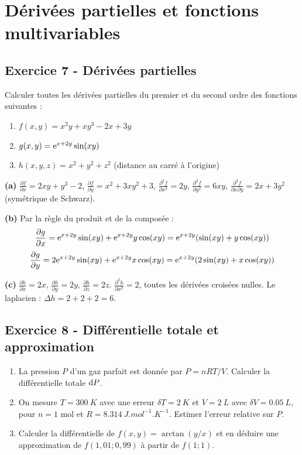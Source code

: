 \documentclass[12pt,a4paper]{article}
\begin{document}
\section{Dérivées partielles et fonctions multivariables}

\subsection*{Exercice 7 - Dérivées partielles \niveau{\facile}}

\begin{boiteexercice}
Calculer toutes les dérivées partielles du premier et du second ordre des fonctions suivantes :
\begin{enumerate}[label=(\alph*)]
  \item $f(x,y) = x^2 y + xy^3 - 2x + 3y$
  \item $g(x,y) = \mathrm{e}^{x+2y}\sin(xy)$
  \item $h(x,y,z) = x^2+y^2+z^2$ (distance au carré à l'origine)
\end{enumerate}
\end{boiteexercice}

\begin{boitecorrige}
\textbf{(a)} $\frac{\partial f}{\partial x} = 2xy+y^3-2$, $\frac{\partial f}{\partial y} = x^2+3xy^2+3$, $\frac{\partial^2 f}{\partial x^2}=2y$, $\frac{\partial^2 f}{\partial y^2}=6xy$, $\frac{\partial^2 f}{\partial x\partial y}=2x+3y^2$ (symétrique de Schwarz).

\textbf{(b)} Par la règle du produit et de la composée :
\[
\frac{\partial g}{\partial x} = \mathrm{e}^{x+2y}\sin(xy) + \mathrm{e}^{x+2y}y\cos(xy) = \mathrm{e}^{x+2y}(\sin(xy)+y\cos(xy))
\]
\[
\frac{\partial g}{\partial y} = 2\mathrm{e}^{x+2y}\sin(xy) + \mathrm{e}^{x+2y}x\cos(xy) = \mathrm{e}^{x+2y}(2\sin(xy)+x\cos(xy))
\]

\textbf{(c)} $\frac{\partial h}{\partial x}=2x$, $\frac{\partial h}{\partial y}=2y$, $\frac{\partial h}{\partial z}=2z$.
$\frac{\partial^2 h}{\partial x^2} = 2$, toutes les dérivées croisées nulles. Le laplacien : $\Delta h = 2+2+2=6$.
\end{boitecorrige}

\subsection*{Exercice 8 - Différentielle totale et approximation \niveau{\moyen}}

\begin{boiteexercice}
\begin{enumerate}
  \item La pression $P$ d'un gaz parfait est donnée par $P = nRT/V$. Calculer la différentielle totale $\mathrm{d} P$.
  \item On mesure $T = \qty{300}{K}$ avec une erreur $\delta T = \qty{2}{K}$ et $V = \qty{2}{L}$ avec $\delta V = \qty{0.05}{L}$, pour $n = 1$ mol et $R = \qty{8.314}{J.mol^{-1}.K^{-1}}$. Estimer l'erreur relative sur $P$.
  \item Calculer la différentielle de $f(x,y) = \arctan(y/x)$ et en déduire une approximation de $f(1{,}01; 0{,}99)$ à partir de $f(1;1)$.
\end{enumerate}
\end{boiteexercice}
\end{document}
